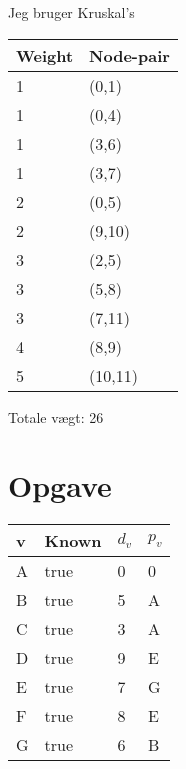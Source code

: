 \documentclass{article}
\begin{document}
Jeg bruger Kruskal's 
\begin{table}[H]
\centering
\begin{tabular}{|l|l|}
\hline
\rowcolor[HTML]{C0C0C0} 
Weight  & Node-pair \\ \hline
1       & (0,1)     \\ \hline
1       & (0,4)     \\ \hline
1       & (3,6)     \\ \hline
1       & (3,7)     \\ \hline
2       & (0,5)     \\ \hline
2       & (9,10)     \\ \hline
3       & (2,5)     \\ \hline
3       & (5,8)     \\ \hline
3       & (7,11)     \\ \hline
4       & (8,9)     \\ \hline
5       & (10,11)     \\ \hline
\end{tabular}
\end{table}

Totale vægt: 26

\section{Opgave} %
\begin{table}[H]
\centering
\begin{tabular}{|l|l|l|l|}
\hline
\rowcolor[HTML]{C0C0C0} 
v  & Known & $d_v$  & $p_v$     \\ \hline
A  & true  & 0      & 0    \\ \hline
B  & true  & 5      & A    \\ \hline
C  & true  & 3      & A    \\ \hline
D  & true  & 9      & E    \\ \hline
E  & true  & 7      & G    \\ \hline
F  & true  & 8      & E    \\ \hline
G  & true  & 6      & B    \\ \hline
\end{tabular}
\end{table}
\end{document}
